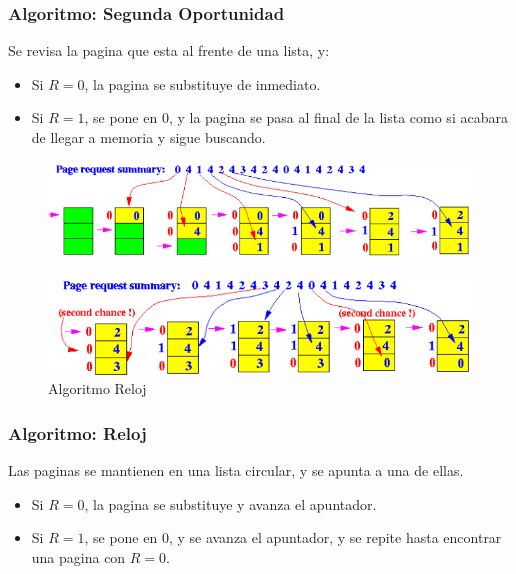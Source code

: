 \documentclass{beamer}
\newcommand{\algTitle}{\textbf{Algoritmo:} }
\begin{document}
\begin{frame}
	\frametitle{\algTitle Segunda Oportunidad}
	\footnotesize	
	Se revisa la pagina que esta al frente de una lista, y:
	\begin{itemize}
		\footnotesize
		\item Si $R = 0$, la pagina se substituye de inmediato.
		\item Si $R = 1$, se pone en 0, y la pagina se pasa al final de la lista como si acabara de llegar a memoria y sigue buscando.
	\end{itemize}
	
	\begin{figure}[H]
		\centering
		\includegraphics[scale=0.45]{img/sop1.png}
	\end{figure}
	\begin{figure}[H]
		\centering
		\includegraphics[scale=0.45]{img/sop2.png}
		\caption{Algoritmo Reloj}
	\end{figure}
\end{frame}


\begin{frame}
	\frametitle{\algTitle Reloj}

	Las paginas se mantienen en una lista circular, y se apunta a una de ellas.
	\begin{itemize}
		\item Si $R = 0$, la pagina se substituye y avanza el apuntador.
		\item Si $R = 1$, se pone en 0, y se avanza el apuntador, y se repite hasta encontrar una pagina con $R = 0$.
	\end{itemize}
	
\end{frame}
\end{document}
